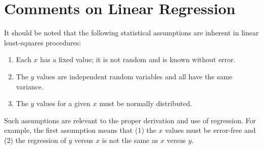 \documentclass[book.tex]{subfiles}
\begin{document}
\section{Comments on Linear Regression}
It should be noted that the following statistical assumptions are inherent in linear least-squares procedures:
\begin{enumerate}
	\item Each $x$ has a fixed value; it is not random and is known without error.
	\item The $y$ values are independent random variables and all have the same variance.
	\item The $y$ values for a given $x$ must be normally distributed.
\end{enumerate}
Such assumptions are relevant to the proper derivation and use of regression. For
example, the first assumption means that (1) the $x$ values must be error-free and (2) the
regression of $y$ versus $x$ is not the same as $x$ versus $y$.
\end{document}
